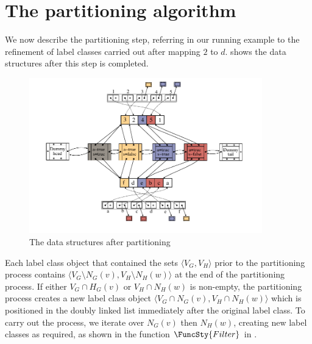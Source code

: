 \FloatBarrier

\section{The partitioning algorithm}

We now describe the partitioning step, referring in our running example to
the refinement of label classes carried out after mapping $2$ to $d$.
 shows the data structures after this step is completed.

\begin{figure}[htb]
    \centering
    \includegraphics*[width=0.9\textwidth]{14b-mcsplit-induced-si/figs/data-structure-step-3}
    \caption{The data structures after partitioning}
    \label{figure:si-data-structures-3}
\end{figure}

Each label class object that contained the sets $\langle V_G, V_H \rangle$ prior
to the partitioning process contains $\langle V_G \setminus N_G(v), V_H \setminus N_H(w)\rangle$
at the end of the partitioning process.  If either $V_G \cap H_G(v)$ or $V_H \cap N_H(w)$
is non-empty, the partitioning process creates a new label class object
$\langle V_G \cap N_G(v), V_H \cap N_H(w)\rangle$ which is
positioned in the doubly linked list immediately after the original label class.
To carry out the process, we iterate over $N_G(v)$ then $N_H(w)$,
creating new label classes as required, as shown in the function $\FuncSty{Filter}$
in .

